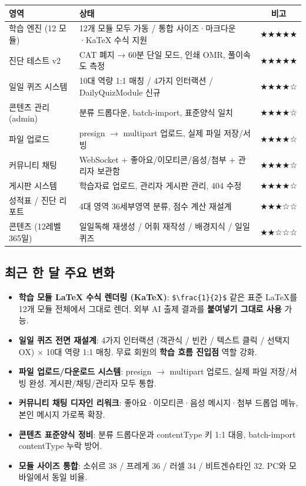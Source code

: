 \documentclass[11pt,a4paper]{article}
\begin{document}
\begin{tabularx}{\textwidth}{lXc}
\toprule
\rowcolor{rowbg}\textbf{영역} & \textbf{상태} & \textbf{비고} \\
\midrule
학습 엔진 (12 모듈) & 12개 모듈 모두 가동 / 통합 사이즈·마크다운·KaTeX 수식 지원 & ★★★★★ \\
진단 테스트 v2 & CAT 폐지 → 60분 단일 모드, 인쇄 OMR, 풀이속도 측정 & ★★★★★ \\
일일 퀴즈 시스템 & 10대 역량 1:1 매칭 / 4가지 인터랙션 / DailyQuizModule 신규 & ★★★★☆ \\
콘텐츠 관리 (admin) & 분류 드롭다운, batch-import, 표준양식 일치 & ★★★★☆ \\
파일 업로드 & presign $\to$ multipart 업로드, 실제 파일 저장/서빙 & ★★★★☆ \\
커뮤니티 채팅 & WebSocket + 좋아요/이모티콘/음성/첨부 + 관리자 보관함 & ★★★★☆ \\
게시판 시스템 & 학습자료 업로드, 관리자 게시판 관리, 404 수정 & ★★★★☆ \\
성적표 / 진단 리포트 & 4대 영역 36세부영역 분류, 점수 계산 재설계 & ★★★☆☆ \\
콘텐츠 (12레벨 365일) & 일일독해 재생성 / 어휘 재작성 / 배경지식 / 일일 퀴즈 & ★★☆☆☆ \\
\bottomrule
\end{tabularx}

\subsection{최근 한 달 주요 변화}

\begin{itemize}
  \item \textbf{학습 모듈 LaTeX 수식 렌더링 (KaTeX)}: \texttt{\$\textbackslash frac\{1\}\{2\}\$} 같은 표준 LaTeX를 12개 모듈 전체에서 그대로 렌더. 외부 AI 출제 결과를 \textbf{붙여넣기 그대로 사용} 가능.
  \item \textbf{일일 퀴즈 전면 재설계}: 4가지 인터랙션 (객관식 / 빈칸 / 텍스트 클릭 / 선택지 OX) × 10대 역량 1:1 매칭. 무료 회원의 \textbf{학습 흐름 진입점} 역할 강화.
  \item \textbf{파일 업로드/다운로드 시스템}: presign $\to$ multipart 업로드, 실제 파일 저장/서빙 완성. 게시판/채팅/관리자 모두 통합.
  \item \textbf{커뮤니티 채팅 디자인 리워크}: 좋아요·이모티콘·음성 메시지·첨부 드롭업 메뉴, 본인 메시지 가로폭 확장.
  \item \textbf{콘텐츠 표준양식 정비}: 분류 드롭다운과 contentType 키 1:1 대응, batch-import contentType 누락 방어.
  \item \textbf{모듈 사이즈 통합}: 소쉬르 38 / 프레게 36 / 러셀 34 / 비트겐슈타인 32. PC와 모바일에서 동일 비율.
\end{itemize}
\end{document}
